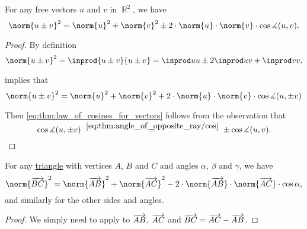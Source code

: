 \begin{theorem}\label{thm:law_of_cosines_for_vectors}
  For any free vectors \( u \) and \( v \) in \( \BbbR^2 \), we have
  \begin{equation}\label{eq:thm:law_of_cosines_for_vectors}
    \norm{u \pm v}^2 = \norm{u}^2 + \norm{v}^2 \pm 2 \cdot \norm{u} \cdot \norm{v} \cdot \cos \measuredangle(u, v).
  \end{equation}
\end{theorem}
\begin{proof}
  By definition
  \begin{equation*}
    \norm{u \pm v}^2
    =
    \inprod{u \pm v} {u \pm v}
    =
    \inprod u u \pm 2 \inprod u v + \inprod v v.
  \end{equation*}

   implies that
  \begin{equation*}
    \norm{u \pm v}^2 = \norm{u}^2 + \norm{v}^2 + 2 \cdot \norm{u} \cdot \norm{v} \cdot \cos \measuredangle(u, \pm v)
  \end{equation*}

  Then \eqref{eq:thm:law_of_cosines_for_vectors} follows from the observation that
  \begin{equation*}
    \cos \measuredangle (u, \pm v)
    \reloset {\eqref{eq:thm:angle_of_opposite_ray/cos}} =
    \pm \cos \measuredangle (u, v).
  \end{equation*}
\end{proof}

\begin{corollary}\label{thm:law_of_cosines_for_triangles}
  For any \hyperref[def:triangle]{triangle} with vertices \( A \), \( B \) and \( C \) and angles \( \alpha \), \( \beta \) and \( \gamma \), we have
  \begin{equation}\label{eq:thm:law_of_cosines_for_triangles}
    \norm{\vect{BC}}^2 = \norm{\vect{AB}}^2 + \norm{\vect{AC}}^2 - 2 \cdot \norm{\vect{AB}} \cdot \norm{\vect{AC}} \cdot \cos \alpha,
  \end{equation}
  and similarly for the other sides and angles.
\end{corollary}
\begin{proof}
  We simply need to apply  to \( \overrightarrow{AB} \), \( \overrightarrow{AC} \) and \( \overrightarrow{BC} = \overrightarrow{AC} - \overrightarrow{AB} \).
\end{proof}

